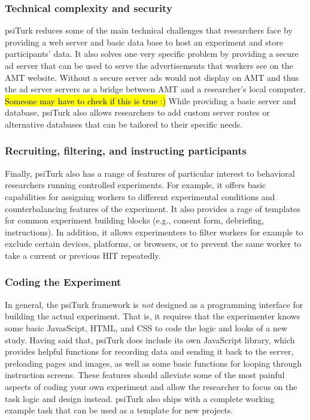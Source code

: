 \documentclass[twocolumn]{svjour3}          %
\begin{document}
\subsubsection{Technical complexity and security}
psiTurk reduces some of the main technical challenges that researchers face by providing a 
web server and basic data base to host an experiment and store participants' data. 
It also solves one very specific problem by providing a secure ad server that can
be used to serve the advertisements that workers see on the AMT website. Without  a secure server
 ads would not display on AMT and thus the ad server servers as a bridge between AMT and 
 a researcher's local computer. \hl{Someone may have to check if this is true :)} 
While providing a basic server and database, psiTurk also allows researchers to add custom
server routes or alternative databases that can be tailored to their specific needs. 


\subsubsection{Recruiting, filtering, and instructing participants}
Finally, psiTurk also has a range of features of particular interest to behavioral researchers
running controlled experiments. 
For example, it offers basic capabilities for assigning workers to different experimental conditions 
and counterbalancing features of the experiment. It also provides  a rage of templates
for common experiment building blocks (e.g., consent form, debriefing, instructions).
In addition, it allows experimenters to filter workers for example to exclude certain devices, platforms, or browsers, 
or to prevent the same worker to take a current or previous HIT repeatedly.


\subsubsection{Coding the Experiment}
In general, the psiTurk framework is \emph{not} designed as a programming interface for building the actual experiment.
That is, it requires that the experimenter knows some basic JavasScipt, HTML, and CSS to code the logic and looks of a new study.
Having said that, psiTurk does include its own JavaScript library, which provides helpful functions for recording data and sending
it back to the server, preloading pages and images, as well as some basic functions for looping through instruction screens. These
features should alleviate some of the most painful aspects of coding your own experiment and allow the researcher to focus
on the task logic and design instead. psiTurk also ships with a complete working example task that can be used as a template for 
new projects.
\end{document}
